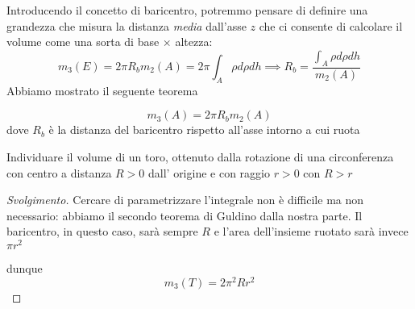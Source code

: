 Introducendo il concetto di baricentro, potremmo pensare di definire una grandezza che misura la distanza \emph{media} dall'asse $z$ che ci consente di calcolare il volume come una sorta di base $\times$ altezza:
$$
m_3(E) = 2 \pi R_b m_2(A) = 2 \pi \int_A \rho d\rho dh \implies R_b = \frac{\int_A \rho d\rho dh}{m_2(A)}
$$
Abbiamo mostrato il seguente teorema
\begin{theorem}
	$$m_3(A) = 2 \pi R_b m_2(A) $$ dove $R_b$ è la distanza del baricentro rispetto all'asse intorno a cui ruota 
\end{theorem}
\begin{exercise}
Individuare il volume di un toro, ottenuto dalla rotazione di una circonferenza con centro a distanza $R > 0$ dall' origine e con raggio $r > 0$ con $R > r$
\end{exercise}
\begin{proof}[Svolgimento]
Cercare di parametrizzare l'integrale non è difficile ma non necessario: abbiamo il secondo teorema di Guldino dalla nostra parte. Il baricentro, in questo caso, sarà sempre $R$ e l'area dell'insieme ruotato sarà invece $\pi r^2$
\begin{figure}
	\centering
\end{figure}
dunque
$$
m_3(T) = 2\pi^2 Rr^2
$$
\end{proof}
